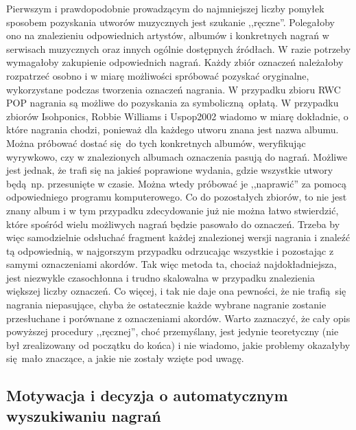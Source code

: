 Pierwszym i prawdopodobnie prowadzącym do najmniejszej liczby pomyłek sposobem pozyskania utworów muzycznych jest szukanie ,,ręczne''. Polegałoby ono na znalezieniu odpowiednich artystów, albumów i konkretnych nagrań w serwisach muzycznych oraz innych ogólnie dostępnych źródłach. W razie potrzeby wymagałoby zakupienie odpowiednich nagrań. Każdy zbiór oznaczeń należałoby rozpatrzeć osobno i w miarę możliwości spróbować pozyskać oryginalne, wykorzystane podczas tworzenia oznaczeń nagrania. W przypadku zbioru RWC POP nagrania są możliwe do pozyskania za symboliczną opłatą. W przypadku zbiorów Isohponics, Robbie Williams i Uspop2002 wiadomo w miarę dokładnie, o które nagrania chodzi, ponieważ dla każdego utworu znana jest nazwa albumu. Można próbować dostać się do tych konkretnych albumów, weryfikując wyrywkowo, czy w znalezionych albumach oznaczenia pasują do nagrań. Możliwe jest jednak, że trafi się na jakieś poprawione wydania, gdzie wszystkie utwory będą np. przesunięte w czasie. Można wtedy próbować je ,,naprawić'' za pomocą odpowiedniego programu komputerowego. Co do pozostałych zbiorów, to nie jest znany album i w tym przypadku zdecydowanie już nie można łatwo stwierdzić, które spośród wielu możliwych nagrań będzie pasowało do oznaczeń. Trzeba by więc samodzielnie odsłuchać fragment każdej znalezionej wersji nagrania i znaleźć tą odpowiednią, w najgorszym przypadku odrzucając wszystkie i pozostając z samymi oznaczeniami akordów. Tak więc metoda ta, chociaż najdokładniejsza, jest niezwykle czasochłonna i trudno skalowalna w przypadku znalezienia większej liczby oznaczeń. Co więcej, i tak nie daje ona pewności, że nie trafią się nagrania niepasujące, chyba że ostatecznie każde wybrane nagranie zostanie przesłuchane i porównane z oznaczeniami akordów. Warto zaznaczyć, że cały opis powyższej procedury ,,ręcznej'', choć przemyślany, jest jedynie teoretyczny (nie był zrealizowany od początku do końca) i nie wiadomo, jakie problemy okazałyby się mało znaczące, a jakie nie zostały wzięte pod uwagę. 

\subsection{Motywacja i decyzja o automatycznym wyszukiwaniu nagrań}

